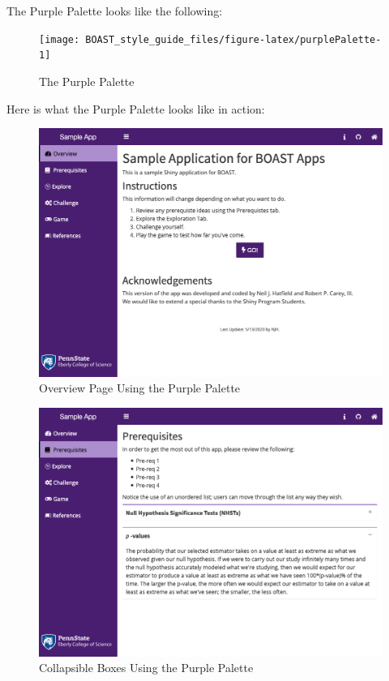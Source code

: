 \documentclass[
]{book}
\begin{document}
The Purple Palette looks like the following:

\begin{figure}

{\centering \texttt{[image: BOAST\_style\_guide\_files/figure-latex/purplePalette-1]} 

}

\caption{The Purple Palette}\label{fig:purplePalette}
\end{figure}

Here is what the Purple Palette looks like in action:

\begin{figure}

{\centering \includegraphics[width=14in]{images/purpleOverview} 

}

\caption{Overview Page Using the Purple Palette}\label{fig:purpleAction1}
\end{figure}

\begin{figure}

{\centering \includegraphics[width=14in]{images/purpleCollapse} 

}

\caption{Collapsible Boxes Using the Purple Palette}\label{fig:purpleAction2}
\end{figure}
\end{document}
